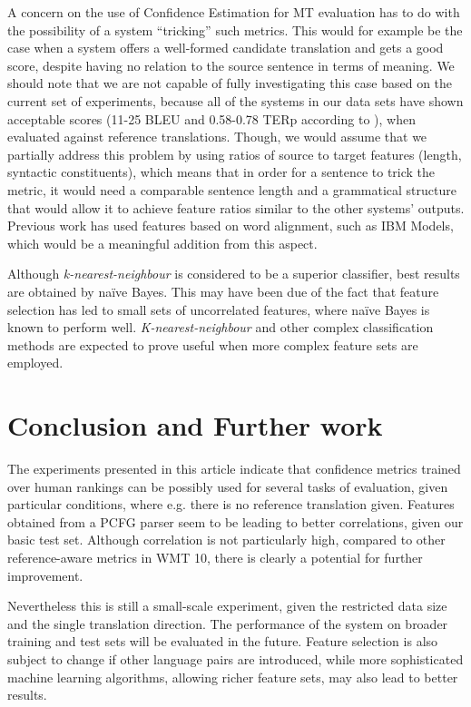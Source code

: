 \documentclass[11pt]{article}
\begin{document}
A concern on the use of Confidence Estimation for MT evaluation has to do with
the possibility of a system ``tricking'' such metrics. This would for example be
the case when a system offers a well-formed candidate translation and gets a
good score, despite having no relation to the source sentence in terms of
meaning. We should note that we are not capable of fully investigating this case
based on the current set of experiments, because all of the systems in our data sets have
shown acceptable scores (11-25 BLEU and 0.58-0.78 TERp according to
), when evaluated against reference
translations. Though, we would assume that we partially address this problem by using ratios of source to target features (length, syntactic
constituents), which means that in order for a sentence to trick the metric, it
would need a comparable sentence length and a grammatical structure that would
allow it to achieve feature ratios similar to the other systems' outputs.
Previous work \cite{Blatz04confidenceestimation,Ueffing05word-levelconfidence} has used features based on
word alignment, such as IBM Models, which would be a meaningful addition from this aspect.

Although \textit{k-nearest-neighbour} is considered to be a superior classifier,
best results are obtained by naïve Bayes. This may have been due of the fact
that feature selection has led to small sets of uncorrelated features, where
naïve Bayes is known to perform well. \textit{K-nearest-neighbour} and other
complex classification methods are expected to prove useful when more complex
feature sets are employed.

\section {Conclusion and Further work}

The experiments presented in this article indicate that confidence metrics
trained over human rankings can be possibly used for several tasks of
evaluation, given particular conditions, where e.g. there is no reference
translation given. Features obtained from a PCFG parser seem to be
leading to better correlations, given our basic test set. Although
correlation is not particularly high, compared to other reference-aware metrics
in WMT 10, there is clearly a potential for further improvement.

Nevertheless this is still a small-scale experiment, given the restricted data
size and the single translation direction. The performance of the system on
broader training and test sets will be evaluated in the future. Feature
selection is also subject to change if other language pairs are introduced,
while more sophisticated machine learning algorithms, allowing richer feature
sets, may also lead to better results. 
\end{document}
